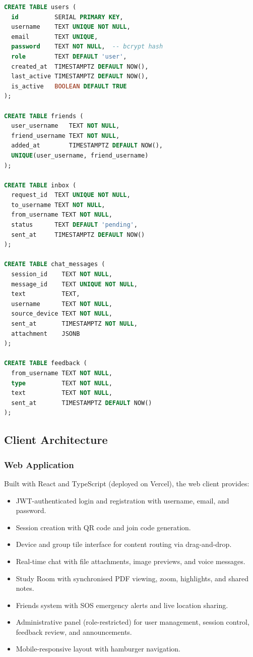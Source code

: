 \documentclass[conference]{IEEEtran}
\begin{document}
\begin{lstlisting}[language=SQL]
CREATE TABLE users (
  id          SERIAL PRIMARY KEY,
  username    TEXT UNIQUE NOT NULL,
  email       TEXT UNIQUE,
  password    TEXT NOT NULL,  -- bcrypt hash
  role        TEXT DEFAULT 'user',
  created_at  TIMESTAMPTZ DEFAULT NOW(),
  last_active TIMESTAMPTZ DEFAULT NOW(),
  is_active   BOOLEAN DEFAULT TRUE
);

CREATE TABLE friends (
  user_username   TEXT NOT NULL,
  friend_username TEXT NOT NULL,
  added_at        TIMESTAMPTZ DEFAULT NOW(),
  UNIQUE(user_username, friend_username)
);

CREATE TABLE inbox (
  request_id  TEXT UNIQUE NOT NULL,
  to_username TEXT NOT NULL,
  from_username TEXT NOT NULL,
  status      TEXT DEFAULT 'pending',
  sent_at     TIMESTAMPTZ DEFAULT NOW()
);

CREATE TABLE chat_messages (
  session_id    TEXT NOT NULL,
  message_id    TEXT UNIQUE NOT NULL,
  text          TEXT,
  username      TEXT NOT NULL,
  source_device TEXT NOT NULL,
  sent_at       TIMESTAMPTZ NOT NULL,
  attachment    JSONB
);

CREATE TABLE feedback (
  from_username TEXT NOT NULL,
  type          TEXT NOT NULL,
  text          TEXT NOT NULL,
  sent_at       TIMESTAMPTZ DEFAULT NOW()
);
\end{lstlisting}

\subsection{Client Architecture}

\subsubsection{Web Application}

Built with React and TypeScript (deployed on Vercel), the web client provides:
\begin{itemize}
    \item JWT-authenticated login and registration with username, email, and password.
    \item Session creation with QR code and join code generation.
    \item Device and group tile interface for content routing via drag-and-drop.
    \item Real-time chat with file attachments, image previews, and voice messages.
    \item Study Room with synchronised PDF viewing, zoom, highlights, and shared notes.
    \item Friends system with SOS emergency alerts and live location sharing.
    \item Administrative panel (role-restricted) for user management, session control, feedback review, and announcements.
    \item Mobile-responsive layout with hamburger navigation.
\end{itemize}
\end{document}
